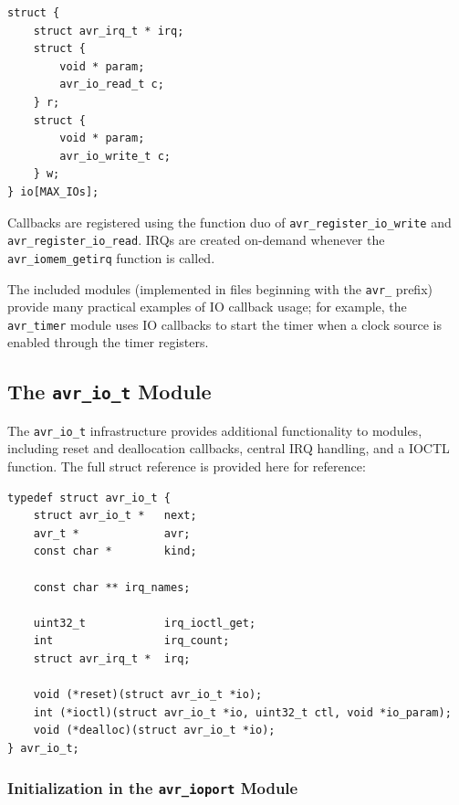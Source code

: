\begin{lstlisting}
struct {
    struct avr_irq_t * irq;
    struct {
        void * param;
        avr_io_read_t c;
    } r;
    struct {
        void * param;
        avr_io_write_t c;
    } w;
} io[MAX_IOs];
\end{lstlisting}

Callbacks are registered using the function duo of \lstinline|avr_register_io_write|
and \lstinline|avr_register_io_read|. \acp{IRQ} are created on-demand whenever
the \lstinline|avr_iomem_getirq| function is called.

The included \simavr modules (implemented in files beginning with the \verb|avr_| prefix)
provide many practical examples of \ac{IO} callback usage; for example,
the \verb|avr_timer| module uses \ac{IO} callbacks to start the timer when
a clock source is enabled through the timer registers.

\subsection{The \lstinline|avr_io_t| Module} \label{subsection:avr_io_t}

The \lstinline|avr_io_t| infrastructure provides additional functionality to
modules, including reset and deallocation callbacks, central \ac{IRQ} handling,
and a \ac{IOCTL} function. The full struct reference is provided here for reference:

\begin{lstlisting}
typedef struct avr_io_t {
    struct avr_io_t *   next;
    avr_t *             avr;
    const char *        kind;

    const char ** irq_names;

    uint32_t            irq_ioctl_get;
    int                 irq_count;
    struct avr_irq_t *  irq;

    void (*reset)(struct avr_io_t *io);
    int (*ioctl)(struct avr_io_t *io, uint32_t ctl, void *io_param);
    void (*dealloc)(struct avr_io_t *io);
} avr_io_t;
\end{lstlisting}

\subsubsection{Initialization in the \lstinline|avr_ioport| Module}

